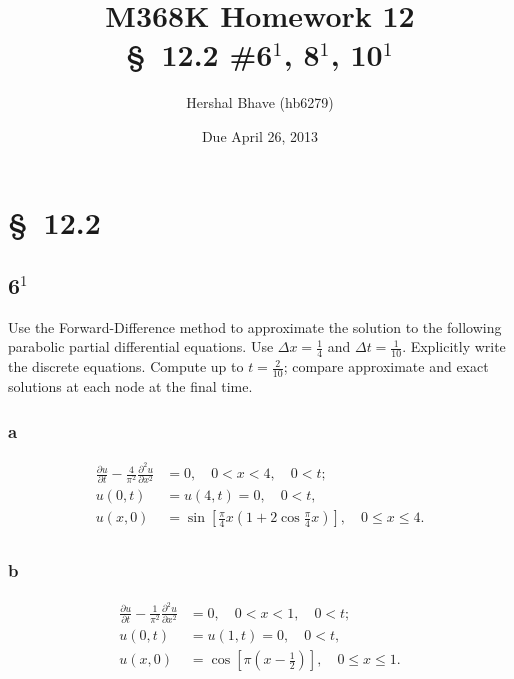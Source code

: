 \documentclass[12pt]{article}
\title{M368K Homework 12 \\
  \normalsize{\S~12.2 \#6$^1$, 8$^1$, 10$^1$ }}
\author{Hershal Bhave (hb6279)}
\date{Due April 26, 2013}
\begin{document}
\maketitle

\section{\S~12.2}
\subsection{6$^1$}
\label{sec:6}
Use the Forward-Difference method to approximate the solution to the
following parabolic partial differential equations. Use $\Delta x =
\frac{1}{4}$ and $\Delta t = \frac{1}{10}$. Explicitly write the
discrete equations. Compute up to $t=\frac{2}{10}$; compare
approximate and exact solutions at each node at the final time.

\subsubsection{a}
\begin{equation}
\label{eq:6a_q}
\begin{aligned}
  \frac{\partial u}{\partial t} - \frac{4}{\pi^2}
  \frac{\partial^2u}{\partial x^2} &= 0,\quad 0<x<4,\quad 0<t;\\
  u(0,t) &= u(4,t)=0, \quad 0<t,\\
  u(x,0) &=
  \sin\left[\frac{\pi}{4}x
    \left(1+2\cos\frac{\pi}{4}x\right)\right], \quad 0\leq x
    \leq 4.\\
\end{aligned}
\end{equation}

\subsubsection{b}
\begin{equation}
\label{eq:6b_q}
\begin{aligned}
  \frac{\partial u}{\partial t} - \frac{1}{\pi^2}
  \frac{\partial^2u}{\partial x^2} &= 0,\quad 0<x<1,\quad 0<t;\\
  u(0,t) &= u(1,t)=0, \quad 0<t,\\
  u(x,0) &= \cos\left[\pi \left(x-\frac{1}{2}\right)\right], \quad
  0\leq x \leq 1.\\ 
\end{aligned}
\end{equation}
\end{document}
